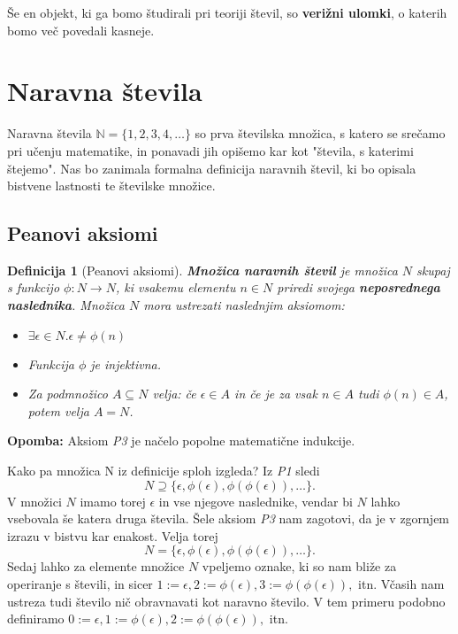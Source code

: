 \documentclass[12pt, a4paper]{article}
\newtheorem{defi}{Definicija}
\newenvironment{opom}[1][]{\par\medskip\noindent \textbf{Opomba: }}{\medskip}
\begin{document}
Še en objekt, ki ga bomo študirali pri teoriji števil, so \textbf{verižni ulomki}, o katerih bomo več povedali kasneje.

\section{Naravna števila}

Naravna števila $\mathbb{N} = \{1,2,3,4,\dots\}$ so prva številska množica, s katero se srečamo pri učenju matematike, in ponavadi jih opišemo kar kot "števila, s katerimi štejemo". Nas bo zanimala formalna definicija naravnih števil, ki bo opisala bistvene lastnosti te številske množice.

\subsection{Peanovi aksiomi}

\begin{defi}[Peanovi aksiomi]
\textbf{Množica naravnih števil} je množica $N$ skupaj s funkcijo $\phi : N\to N$, ki vsakemu elementu $n\in N$ priredi svojega \textbf{neposrednega naslednika}. Množica $N$ mora ustrezati naslednjim aksiomom:
\begin{itemize}
\item[P1.] $\exists \epsilon \in N. \epsilon \neq \phi(n)$
\item[P2.] Funkcija $\phi$ je injektivna.
\item[P3.] Za podmnožico $A\subseteq N$ velja:
če $\epsilon \in A$ in če je za vsak $n\in A$ tudi $\phi(n) \in A$, potem velja $A=N$.
\end{itemize}
\end{defi}

\begin{opom}
Aksiom \textit{P3} je načelo popolne matematične indukcije.
\end{opom}

Kako pa množica N iz definicije sploh izgleda? Iz \textit{P1} sledi $$ N\supseteq \{\epsilon, \phi(\epsilon),\phi(\phi(\epsilon)),\dots\}.$$ V množici $N$ imamo torej $\epsilon$ in vse njegove naslednike, vendar bi $N$ lahko vsebovala še katera druga števila. Šele aksiom \textit{P3} nam zagotovi, da je v zgornjem izrazu v bistvu kar enakost. Velja torej  $$ N = \{\epsilon, \phi(\epsilon),\phi(\phi(\epsilon)),\dots\}.$$ Sedaj lahko za elemente množice $N$ vpeljemo oznake, ki so nam bliže za operiranje s števili, in sicer $1:=\epsilon, 2:=\phi(\epsilon), 3:=\phi(\phi(\epsilon)),$ itn. Včasih nam ustreza tudi število nič obravnavati kot naravno število. V tem primeru podobno definiramo $0:=\epsilon, 1:=\phi(\epsilon), 2:=\phi(\phi(\epsilon)),$ itn.
\end{document}
